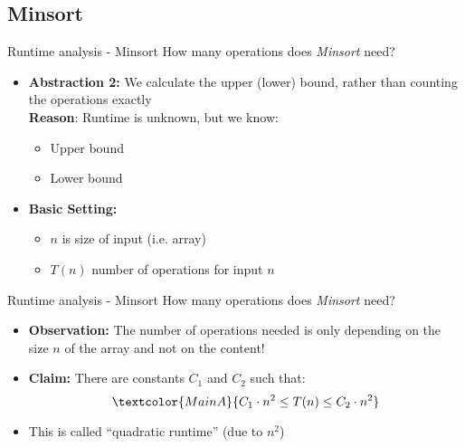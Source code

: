 
\subsection{Minsort}


\begin{frame}{Runtime analysis - Minsort}
  How many operations does \textit{Minsort} need?
  \begin{itemize}
    \item
      \textbf{Abstraction 2:} We calculate the upper (lower) bound,
      rather than counting the operations exactly\\[0.5em]
      \textbf{Reason}: Runtime is unknown, but we know:
      \begin{itemize}
        \item {\color{MainBLight}Upper bound}
        \item {\color{MainBLight}Lower bound}
      \end{itemize}
      \vspace{1em}
    \item
      \textbf{Basic Setting:}
      \begin{itemize}
        \item
          {\color{MainA}$n$} is size of input (i.e. array)
        \item
          {\color{MainA}$T(n)$} number of operations for input
          {\color{MainA}$n$}
      \end{itemize}
  \end{itemize}
\end{frame}


\begin{frame}{Runtime analysis - Minsort}
  How many operations does \textit{Minsort} need?
  \begin{itemize}
    \item
      \textbf{Observation:}
      The number of operations needed is only depending on the size
      {\color{MainA}$n$} of the array and not on the content!
    \item
      \textbf{Claim:}
      There are constants {\color{MainA}$C_1$} and {\color{MainA}$C_2$}
      such that:
      \begin{displaymath}
        \textcolor{MainA}{C_1 \cdot n^2 \leq T(n) \leq C_2 \cdot n^2}
      \end{displaymath}%
    \item
      This is called \enquote{quadratic runtime} (due to {\color{MainA}$n^2$})
  \end{itemize}
\end{frame}


